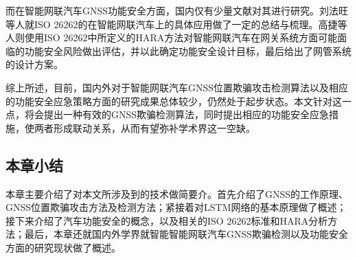 而在智能网联汽车GNSS功能安全方面，国内仅有少量文献对其进行研究。刘法旺\cite{刘法旺2021自动驾驶系统功能安全与预期功能安全研究}等人就ISO 26262的在智能网联汽车上的具体应用做了一定的总结与梳理。高捷\cite{高捷 2021 智能网联汽车网关系统功能安全设计}等人则使用ISO 26262中所定义的HARA方法对智能网联汽车在网关系统方面可能面临的功能安全风险做出评估，并以此确定功能安全设计目标，最后给出了网管系统的设计方案。

综上所述，目前，国内外对于智能网联汽车GNSS位置欺骗攻击检测算法以及相应的功能安全应急策略方面的研究成果总体较少，仍然处于起步状态。本文针对这一点，将会提出一种有效的GNSS欺骗检测算法，同时提出相应的功能安全应急措施，使两者形成联动关系，从而有望弥补学术界这一空缺。

\subsection{本章小结}
本章主要介绍了对本文所涉及到的技术做简要介。首先介绍了GNSS的工作原理、GNSS位置欺骗攻击方法及检测方法；紧接着对LSTM网络的基本原理做了概述；接下来介绍了汽车功能安全的概念，以及相关的ISO 26262标准和HARA分析方法；最后，本章还就国内外学界就智能智能网联汽车GNSS欺骗检测以及功能安全方面的研究现状做了概述。

